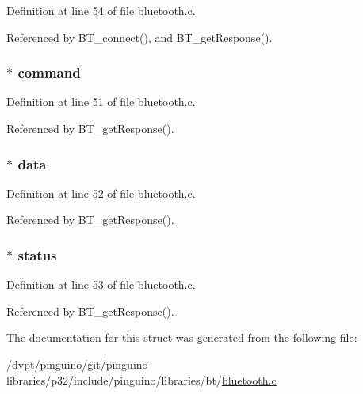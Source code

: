 Definition at line 54 of file bluetooth.\-c.



Referenced by B\-T\-\_\-connect(), and B\-T\-\_\-get\-Response().

\hypertarget{struct_b_t___r_e_s_p_o_n_s_e_a8d1ef2a2d0701e536e45f0ef64ab3c7e}{
\subsubsection[{command}]{$\ast$ command}}\label{struct_b_t___r_e_s_p_o_n_s_e_a8d1ef2a2d0701e536e45f0ef64ab3c7e}


Definition at line 51 of file bluetooth.\-c.



Referenced by B\-T\-\_\-get\-Response().

\hypertarget{struct_b_t___r_e_s_p_o_n_s_e_a40767ad71451f60885c01f28dd2a4b47}{
\subsubsection[{data}]{$\ast$ data}}\label{struct_b_t___r_e_s_p_o_n_s_e_a40767ad71451f60885c01f28dd2a4b47}


Definition at line 52 of file bluetooth.\-c.



Referenced by B\-T\-\_\-get\-Response().

\hypertarget{struct_b_t___r_e_s_p_o_n_s_e_a938eb71a1ec2d6626b341381e12a0c61}{
\subsubsection[{status}]{$\ast$ status}}\label{struct_b_t___r_e_s_p_o_n_s_e_a938eb71a1ec2d6626b341381e12a0c61}


Definition at line 53 of file bluetooth.\-c.



Referenced by B\-T\-\_\-get\-Response().



The documentation for this struct was generated from the following file\-:\begin{DoxyCompactItemize}
\item 
/dvpt/pinguino/git/pinguino-\/libraries/p32/include/pinguino/libraries/bt/\hyperlink{bluetooth_8c}{bluetooth.\-c}\end{DoxyCompactItemize}
